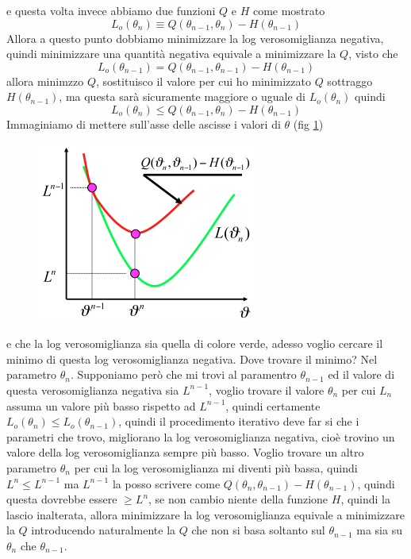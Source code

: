 e questa volta invece abbiamo due funzioni $Q$ e $H$ come mostrato
\begin{equation}
L_o (\theta_n) \equiv Q(\theta_{n-1}, \theta_n) - H(\theta_{n-1})
\end{equation}
Allora a questo punto dobbiamo minimizzare la log verosomiglianza negativa, quindi minimizzare una quantità negativa equivale a minimizzare la $Q$, visto che 
\begin{equation}
L_o (\theta_{n-1}) = Q(\theta_{n-1}, \theta_{n-1}) - H(\theta_{n-1})
\end{equation}
allora minimzzo $Q$, sostituisco il valore per cui ho minimizzato $Q$ sottraggo $H(\theta_{n-1})$, ma questa sarà sicuramente maggiore o uguale di $L_o(\theta_n)$ quindi
\begin{equation}
L_o (\theta_n) \leq Q(\theta_{n-1}, \theta_n) - H(\theta_{n-1})
\end{equation}
Immaginiamo di mettere sull'asse delle ascisse i valori di $\theta$ (fig \ref{em2})
\begin{figure}
\centering
\includegraphics[scale=0.7]{img/em2.png}
\caption{}
\label{em2}
\end{figure}
e che la log verosomiglianza sia quella di colore verde, adesso voglio cercare il minimo di questa log verosomiglianza negativa. Dove trovare il minimo? Nel parametro $\theta_n$. Supponiamo però che mi trovi al paramentro $\theta_{n-1}$ ed il valore di questa verosomiglianza negativa sia $L^{n-1}$, voglio trovare il valore $\theta_n$ per cui $L_n$ assuma un valore più basso rispetto ad $L^{n-1}$, quindi certamente $L_o(\theta_n) \leq L_o(\theta_{n-1})$, quindi il procedimento iterativo deve far si che i parametri che trovo, migliorano la log verosomiglianza negativa, cioè trovino un valore della log verosomiglianza sempre più basso.  Voglio trovare un altro parametro $\theta_n$ per cui la log verosomiglianza mi diventi più bassa, quindi $L^n \leq L^{n-1}$ ma $L^{n-1}$ la posso scrivere come $Q(\theta_n, \theta_{n-1}) - H(\theta_{n-1})$, quindi questa dovrebbe essere $ \geq L^n$, se non cambio niente della funzione $H$, quindi la lascio inalterata, allora minimizzare la log verosomiglianza equivale a minimizzare la $Q$ introducendo naturalmente la $Q$ che non si basa soltanto sul $\theta_{n-1}$ ma sia su $\theta_{n}$ che $\theta_{n-1}$. \\

